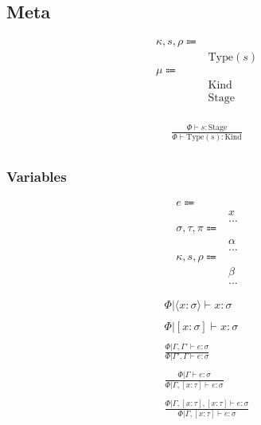 \documentclass {article}
\begin{document}
\subsection{Meta}
\begin{align*}
\kappa, s, \rho \Coloneqq & \\
& \text{Type} (s) \tag{Type} \\
\mu \Coloneqq & \\
& \text{Kind} \\
& \text{Stage} \\
\end{align*}

\begin{gather*}
\frac
{\Phi \vdash s : \text{Stage}}
{\Phi \vdash \text {Type} (s) : \text{Kind}} \\
\end{gather*}


\subsubsection{Variables}
\begin{align*}
e \Coloneqq & \\
& x \tag{Variable} \\
& \dots \\
\sigma, \tau, \pi \Coloneqq & \\
& \alpha \tag{Type Variable} \\
& \dots \\
\kappa, s, \rho \Coloneqq & \\
& \beta \tag{Kind Variable} \\
& \dots
\end{align*}

\begin{gather*}
\Phi | \langle x : \sigma \rangle \vdash x : \sigma \\
\\
\Phi | [ x : \sigma ] \vdash x : \sigma \\
\\
\frac
{\Phi | \Gamma, \Gamma' \vdash e : \sigma}
{\Phi | \Gamma', \Gamma \vdash e : \sigma} \\
\\
\frac
{\Phi | \Gamma \vdash e : \sigma}
{\Phi | \Gamma, [ x : \tau ] \vdash e : \sigma } \\
\\
\frac
{\Phi | \Gamma, [x : \tau], [x : \tau] \vdash e : \sigma}
{\Phi | \Gamma, [x : \tau] \vdash e : \sigma } \\
\end{gather*}
\end{document}
